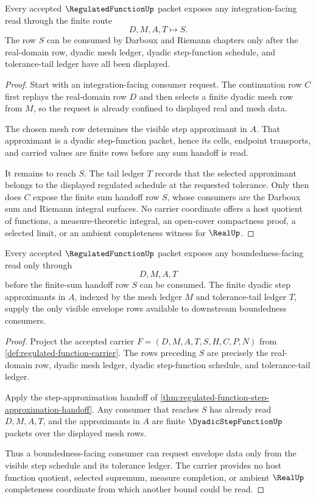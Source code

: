 \begin{theorem}
\label{thm:regulated-function-step-approximation-handoff}
Every accepted $\RegulatedFunctionUp$ packet exposes any integration-facing read through the finite route
$$
D,M,A,T \longmapsto S .
$$
The row $S$ can be consumed by Darboux and Riemann chapters only after the real-domain row, dyadic mesh ledger, dyadic step-function schedule, and tolerance-tail ledger have all been displayed.
\end{theorem}
\begin{proof}
Start with an integration-facing consumer request. The continuation row $C$ first replays the real-domain row $D$ and then selects a finite dyadic mesh row from $M$, so the request is already confined to displayed real and mesh data.

The chosen mesh row determines the visible step approximant in $A$. That approximant is a dyadic step-function packet, hence its cells, endpoint transports, and carried values are finite rows before any sum handoff is read.

It remains to reach $S$. The tail ledger $T$ records that the selected approximant belongs to the displayed regulated schedule at the requested tolerance. Only then does $C$ expose the finite sum handoff row $S$, whose consumers are the Darboux sum and Riemann integral surfaces. No carrier coordinate offers a host quotient of functions, a measure-theoretic integral, an open-cover compactness proof, a selected limit, or an ambient completeness witness for $\RealUp$.
\end{proof}

\begin{theorem}
\label{thm:regulated-function-bounded-step-envelope}
Every accepted $\RegulatedFunctionUp$ packet exposes any boundedness-facing read only through
$$
D,M,A,T
$$
before the finite-sum handoff row $S$ can be consumed. The finite dyadic step approximants in $A$, indexed by the mesh ledger $M$ and tolerance-tail ledger $T$, supply the only visible envelope rows available to downstream boundedness consumers.
\end{theorem}
\begin{proof}
Project the accepted carrier $F=(D,M,A,T,S,H,C,P,N)$ from \autoref{def:regulated-function-carrier}. The rows preceding $S$ are precisely the real-domain row, dyadic mesh ledger, dyadic step-function schedule, and tolerance-tail ledger.

Apply the step-approximation handoff of \autoref{thm:regulated-function-step-approximation-handoff}. Any consumer that reaches $S$ has already read $D,M,A,T$, and the approximants in $A$ are finite $\DyadicStepFunctionUp$ packets over the displayed mesh rows.

Thus a boundedness-facing consumer can request envelope data only from the visible step schedule and its tolerance ledger. The carrier provides no host function quotient, selected supremum, measure completion, or ambient $\RealUp$ completeness coordinate from which another bound could be read.
\end{proof}


